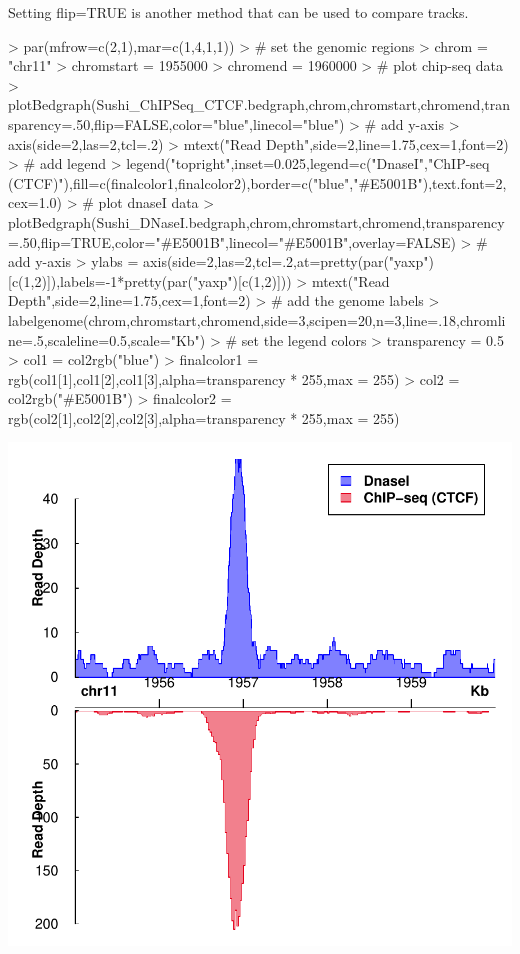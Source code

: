 \documentclass{article}
\begin{document}
Setting flip=TRUE is another method that can be used to compare tracks.


\begin{center}
\begin{Schunk}
\begin{Sinput}
> par(mfrow=c(2,1),mar=c(1,4,1,1))
> # set the genomic regions
> chrom            = "chr11"
> chromstart       = 1955000
> chromend         = 1960000
> # plot chip-seq data
> plotBedgraph(Sushi_ChIPSeq_CTCF.bedgraph,chrom,chromstart,chromend,transparency=.50,flip=FALSE,color="blue",linecol="blue")
> # add y-axis
> axis(side=2,las=2,tcl=.2)
> mtext("Read Depth",side=2,line=1.75,cex=1,font=2)
> # add legend
> legend("topright",inset=0.025,legend=c("DnaseI","ChIP-seq (CTCF)"),fill=c(finalcolor1,finalcolor2),border=c("blue","#E5001B"),text.font=2,cex=1.0)
> # plot dnaseI data
> plotBedgraph(Sushi_DNaseI.bedgraph,chrom,chromstart,chromend,transparency=.50,flip=TRUE,color="#E5001B",linecol="#E5001B",overlay=FALSE)
> # add y-axis
> ylabs = axis(side=2,las=2,tcl=.2,at=pretty(par("yaxp")[c(1,2)]),labels=-1*pretty(par("yaxp")[c(1,2)]))
> mtext("Read Depth",side=2,line=1.75,cex=1,font=2)
> # add the genome labels
> labelgenome(chrom,chromstart,chromend,side=3,scipen=20,n=3,line=.18,chromline=.5,scaleline=0.5,scale="Kb")
> # set the legend colors
> transparency = 0.5
> col1 = col2rgb("blue")
> finalcolor1 = rgb(col1[1],col1[2],col1[3],alpha=transparency * 255,max = 255)
> col2 = col2rgb("#E5001B")
> finalcolor2 = rgb(col2[1],col2[2],col2[3],alpha=transparency * 255,max = 255)
\end{Sinput}
\end{Schunk}
\includegraphics{Sushi-013}
\end{center}
\end{document}
